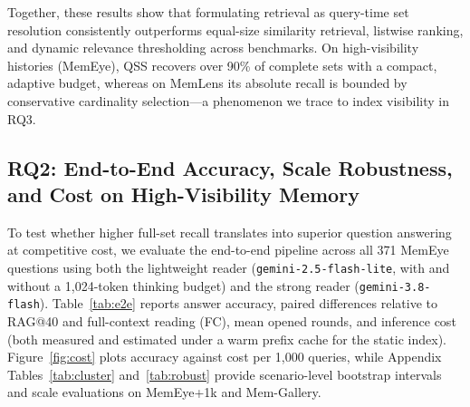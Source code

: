 \documentclass[10pt]{article}
\newcommand{\qss}{QSS}
\begin{document}
Together, these results show that formulating retrieval as query-time set resolution consistently outperforms equal-size similarity retrieval, listwise ranking, and dynamic relevance thresholding across benchmarks. On high-visibility histories (MemEye), \qss{} recovers over 90\% of complete sets with a compact, adaptive budget, whereas on MemLens its absolute recall is bounded by conservative cardinality selection—a phenomenon we trace to index visibility in RQ3.

\subsection{RQ2: End-to-End Accuracy, Scale Robustness, and Cost on High-Visibility Memory}
\label{sec:rq2}

To test whether higher full-set recall translates into superior question answering at competitive cost, we evaluate the end-to-end pipeline across all 371 MemEye questions using both the lightweight reader (\texttt{gemini-2.5-flash-lite}, with and without a 1,024-token thinking budget) and the strong reader (\texttt{gemini-3.8-flash}). Table~\ref{tab:e2e} reports answer accuracy, paired differences relative to RAG@40 and full-context reading (FC), mean opened rounds, and inference cost (both measured and estimated under a warm prefix cache for the static index). Figure~\ref{fig:cost} plots accuracy against cost per 1,000 queries, while Appendix Tables~\ref{tab:cluster} and~\ref{tab:robust} provide scenario-level bootstrap intervals and scale evaluations on MemEye+1k and Mem-Gallery.
\end{document}
